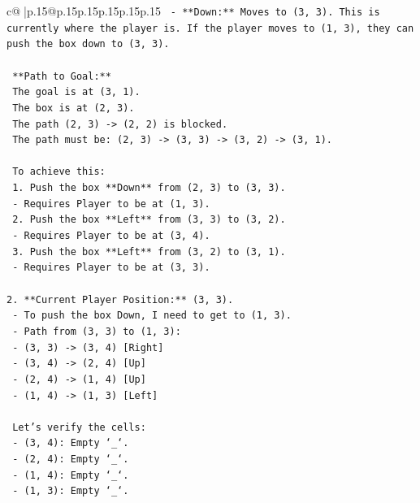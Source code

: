 \documentclass{article}
\begin{document}
{\begin{supertabular}{c@{$\;$}|p{.15\linewidth}@{}p{.15\linewidth}p{.15\linewidth}p{.15\linewidth}p{.15\linewidth}p{.15\linewidth}}
{{{\texttt{    {-} **Down:** Moves to (3, 3). This is currently where the player is. If the player moves to (1, 3), they can push the box down to (3, 3).} \\
\\ 
\texttt{    **Path to Goal:**} \\
\texttt{    The goal is at (3, 1).} \\
\texttt{    The box is at (2, 3).} \\
\texttt{    The path (2, 3) {-}> (2, 2) is blocked.} \\
\texttt{    The path must be: (2, 3) {-}> (3, 3) {-}> (3, 2) {-}> (3, 1).} \\
\\ 
\texttt{    To achieve this:} \\
\texttt{    1.  Push the box **Down** from (2, 3) to (3, 3).} \\
\texttt{        {-} Requires Player to be at (1, 3).} \\
\texttt{    2.  Push the box **Left** from (3, 3) to (3, 2).} \\
\texttt{        {-} Requires Player to be at (3, 4).} \\
\texttt{    3.  Push the box **Left** from (3, 2) to (3, 1).} \\
\texttt{        {-} Requires Player to be at (3, 3).} \\
\\ 
\texttt{2.  **Current Player Position:** (3, 3).} \\
\texttt{    {-} To push the box Down, I need to get to (1, 3).} \\
\texttt{    {-} Path from (3, 3) to (1, 3):} \\
\texttt{        {-} (3, 3) {-}> (3, 4) {[}Right{]}} \\
\texttt{        {-} (3, 4) {-}> (2, 4) {[}Up{]}} \\
\texttt{        {-} (2, 4) {-}> (1, 4) {[}Up{]}} \\
\texttt{        {-} (1, 4) {-}> (1, 3) {[}Left{]}} \\
\\ 
\texttt{    Let's verify the cells:} \\
\texttt{    {-} (3, 4): Empty `\_`.} \\
\texttt{    {-} (2, 4): Empty `\_`.} \\
\texttt{    {-} (1, 4): Empty `\_`.} \\
\texttt{    {-} (1, 3): Empty `\_`.} \\
\\ 
}}}
\end{supertabular}}
\end{document}
